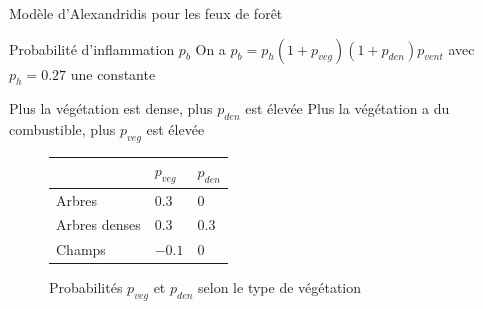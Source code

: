 \documentclass{beamer}
\begin{document}
\begin{frame}{Modèle d'Alexandridis pour les feux de forêt \hyperlink{jump}{\beamerbutton{ }} \hypertarget{9}{\beamerbutton{ }}}
    \begin{block}{Probabilité d'inflammation $p_b$}
        On a $p_b = p_h (1 + p_{veg}) (1 + p_{den}) p_{vent}$ avec $p_h = 0.27$ une constante
    \end{block}

    Plus la végétation est dense, plus $p_{den}$ est élevée
    Plus la végétation a du combustible, plus $p_{veg}$ est élevée

    \begin{figure}[!h]
        \centering
        \renewcommand{\arraystretch}{2}
        \setlength{\extrarowheight}{-3pt}
        \begin{tabular}{ |>{\centering\arraybackslash}p{4cm}|>{\centering\arraybackslash}p{2cm}|>{\centering\arraybackslash}p{2cm}| }
            \cline{2-3}
            \multicolumn{1}{c|}{} & $p_{veg}$ & $p_{den}$ \\
            \hline 
            Arbres & $0.3$ & $0$ \\ 
            \hline
            Arbres denses & $0.3$ & $0.3$ \\ 
            \hline
            Champs & $-0.1$ & $0$ \\
            \hline 
        \end{tabular}
        \caption{Probabilités $p_{veg}$ et $p_{den}$ selon le type de végétation}
    \end{figure}
\end{frame}
\end{document}

